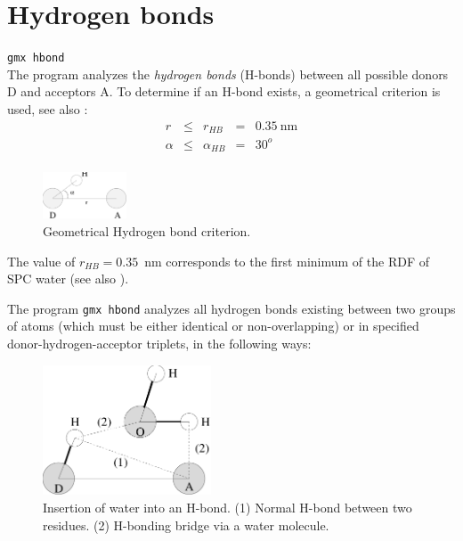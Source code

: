  

\section{Hydrogen bonds}
{\tt gmx hbond}\\
The program {\tt {}} analyzes the {\em hydrogen bonds} (H-bonds)
between all possible donors D and acceptors A. To determine if an
H-bond exists, a geometrical criterion is used, see also
:
\begin{equation}
\begin{array}{rclcl}
r       & \leq  & r_{HB}        & = & 0.35~\mbox{nm}    \\
\alpha  & \leq  & \alpha_{HB}   & = & 30^o              \\
\end{array}
\end{equation}

\begin{figure}
\centerline{\includegraphics[width=2.5cm,angle=270]{plots/hbond}}
\caption{Geometrical Hydrogen bond criterion.}
\label{fig:hbond}
\end{figure}

The value of $r_{HB} = 0.35$~nm corresponds to the first minimum of the RDF of 
SPC water (see also ).

The program {\tt gmx hbond} analyzes all hydrogen bonds existing
between two groups of atoms (which must be either identical or
non-overlapping) or in specified donor-hydrogen-acceptor triplets, in
the following ways:

\begin{figure}
\centerline{
{\includegraphics[width=5cm,angle=270]{plots/hbond-insert}}}
\caption[Insertion of water into an H-bond.]{Insertion of water into
an H-bond. (1) Normal H-bond between two residues. (2) H-bonding
bridge via a water molecule.}
\label{fig:insert}
\end{figure}

